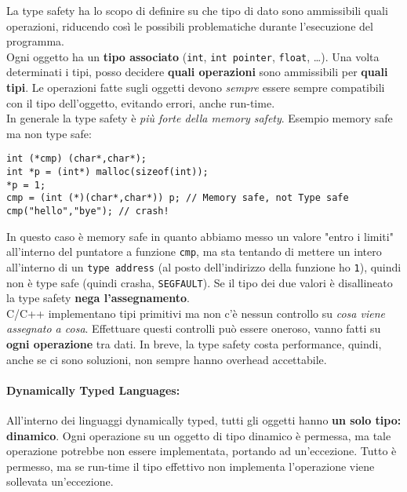 La type safety ha lo scopo di definire su che tipo di dato sono ammissibili quali operazioni, riducendo così le possibili problematiche durante l'esecuzione del programma.\\

Ogni oggetto ha un \textbf{tipo associato} (\texttt{int}, \texttt{int pointer}, \texttt{float}, \dots). Una volta determinati i tipi, posso decidere \textbf{quali operazioni} sono ammissibili per \textbf{quali tipi}. Le operazioni fatte sugli oggetti devono \textit{sempre} essere sempre compatibili con il tipo dell'oggetto, evitando errori, anche run-time.\\

In generale la type safety è \textit{più forte della memory safety}. Esempio memory safe ma non type safe:
\begin{verbatim}
int (*cmp) (char*,char*);
int *p = (int*) malloc(sizeof(int));
*p = 1;
cmp = (int (*)(char*,char*)) p; // Memory safe, not Type safe
cmp("hello","bye"); // crash!
\end{verbatim}

In questo caso è memory safe in quanto abbiamo messo un valore "entro i limiti" all'interno del puntatore a funzione \texttt{cmp}, ma sta tentando di mettere un intero all'interno di un \texttt{type address} (al posto dell'indirizzo della funzione ho \texttt{1}), quindi non è type safe (quindi crasha, \texttt{SEGFAULT}). Se il tipo dei due valori è disallineato la type safety \textbf{nega l'assegnamento}.\\

C/C++ implementano tipi primitivi ma non c'è nessun controllo su \textit{cosa viene assegnato a cosa}. Effettuare questi controlli può essere oneroso, vanno fatti su \textbf{ogni operazione} tra dati. In breve, la type safety costa performance, quindi, anche se ci sono soluzioni, non sempre hanno overhead accettabile. \\

\paragraph{Dynamically Typed Languages:} All'interno dei linguaggi dynamically typed, tutti gli oggetti hanno \textbf{un solo tipo: dinamico}. Ogni operazione su un oggetto di tipo dinamico è permessa, ma tale operazione potrebbe non essere implementata, portando ad un'eccezione.  Tutto è permesso, ma se run-time il tipo effettivo non implementa l'operazione viene sollevata un'eccezione.\\

